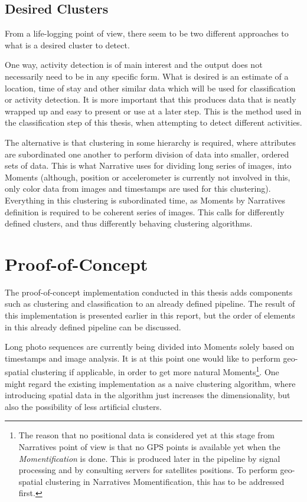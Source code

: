 \subsection{Desired Clusters}
From a life-logging point of view, there seem to be two different approaches
to what is a desired cluster to detect. 

One way, activity detection is of main interest and the output does not 
necessarily need to be in any specific form. What is desired is an estimate
of a location, time of stay and other similar data which will be used for 
classification or activity detection. It is more important that this produces
data that is neatly wrapped up and easy to present or use at a later step. 
This is the method used in the classification step of this thesis, when 
attempting to detect different activities. 

The alternative is that clustering in some hierarchy is required, where 
attributes are subordinated one another to perform division of data into 
smaller, ordered sets of data. This is what Narrative uses for dividing 
long series of images, into Moments (although, position or accelerometer
is currently not involved in this, only color data from images and timestamps 
are used for this clustering). Everything in this clustering is subordinated 
time, as Moments by Narratives definition is required to be coherent series 
of images. This calls for differently defined clusters, and thus differently
behaving clustering algorithms.

\section{Proof-of-Concept}
The proof-of-concept implementation conducted in this thesis adds components such
as clustering and classification to an already defined pipeline. The result of 
this implementation is presented earlier in this report, but the order of elements
in this already defined pipeline can be discussed. 

Long photo sequences are currently being divided into Moments solely based on 
timestamps and image analysis. It is at this point one would like to perform 
geo-spatial clustering if applicable, in order to get more natural Moments\footnote{
    The reason that no positional data is considered yet at this stage from 
    Narratives point of view is that no GPS points is available yet when the 
    \emph{Momentification} is done. This is produced later in the pipeline by 
    signal processing and by consulting servers for satellites positions. To 
    perform geo-spatial clustering in Narratives Momentification, this has to
    be addressed first. 
}. 
One might regard the existing implementation as a naive clustering algorithm, where 
introducing spatial data in the algorithm just increases the dimensionality, but
also the possibility of less artificial clusters. 


